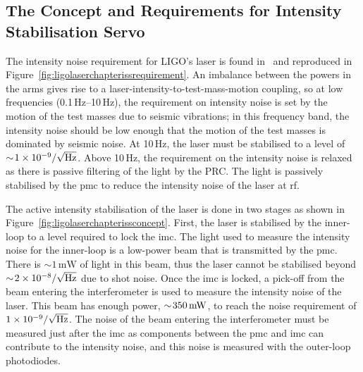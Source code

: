 \subsection{The Concept and Requirements for Intensity Stabilisation Servo}
The intensity noise requirement for LIGO's laser is found in~\cite{PSL_requirements} and reproduced in Figure~\ref{fig:ligolaserchapterissrequirement}. An imbalance between the powers in the arms gives rise to a laser-intensity-to-test-mass-motion coupling, so at low frequencies (0.1\,Hz--10\,Hz), the requirement on intensity noise is set by the motion of the test masses due to seismic vibrations; in this frequency band, the intensity noise should be low enough that the motion of the test masses is dominated by seismic noise. At 10\,Hz, the laser must be stabilised to a level of $\sim\!1\times10^{-9}/\sqrt{\rm{Hz}}$. Above 10\,Hz, the requirement on the intensity noise is relaxed as there is passive filtering of the light by the PRC. The light is passively stabilised by the \gls{pmc} to reduce the intensity noise of the laser at \gls{rf}.  
\par
The active intensity stabilisation of the laser is done in two stages as shown in Figure~\ref{fig:ligolaserchapterissconcept}. First, the laser is stabilised by the inner-loop to a level required to lock the \gls{imc}. The light used to measure the intensity noise for the inner-loop is a low-power beam that is transmitted by the \gls{pmc}. There is $\sim\!1\,\si{\milli\watt}$ of light in this beam, thus the laser cannot be stabilised beyond $\sim\! 2\times10^{-8}/\sqrt{\rm{Hz}}$ due to shot noise. Once the \gls{imc} is locked, a pick-off from the beam entering the interferometer is used to measure the intensity noise of the laser. This beam has enough power, $\sim\! 350\,\rm{mW}$, to reach the noise requirement of $1\times10^{-9}/\sqrt{\rm{Hz}}$. The noise of the beam entering the interferometer must be measured just after the \gls{imc} as components between the \gls{pmc} and \gls{imc} can contribute to the intensity noise, and this noise is measured with the outer-loop photodiodes.
